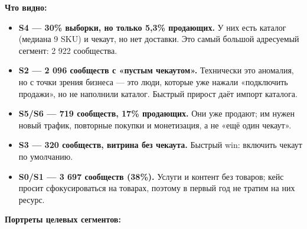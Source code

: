 \documentclass[10pt,a4paper]{article}
\begin{document}
\noindent\textbf{Что видно:}\par\vspace{4pt}

\begin{itemize}[leftmargin=1.35em,itemsep=2pt,topsep=3pt,parsep=0pt]
\item \textbf{S4 — 30\% выборки, но только 5,3\% продающих.} У них есть каталог (медиана 9 SKU) и чекаут, но нет доставки. Это самый большой адресуемый сегмент: 2 922 сообщества.
\item \textbf{S2 — 2 096 сообществ с «пустым чекаутом».} Технически это аномалия, но с точки зрения бизнеса — это люди, которые уже нажали «подключить продажи», но не наполнили каталог. Быстрый прирост даёт импорт каталога.
\item \textbf{S5/S6 — 719 сообществ, 17\% продающих.} Они уже продают; им нужен новый трафик, повторные покупки и монетизация, а не «ещё один чекаут».
\item \textbf{S3 — 320 сообществ, витрина без чекаута.} Быстрый win: включить чекаут по умолчанию.
\item \textbf{S0/S1 — 3 697 сообществ (38\%).} Услуги и контент без товаров; кейс просит сфокусироваться на товарах, поэтому в первый год не тратим на них ресурс.
\end{itemize}

\noindent\textbf{Портреты целевых сегментов:}\par\vspace{4pt}
\end{document}
